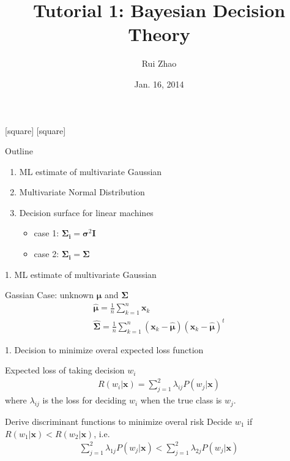 \documentclass[compress,blue]{beamer}
\title[ENGG 5202 Pattern Recogntion Tutorial 1]{Tutorial 1: Bayesian Decision Theory}
\author{Rui Zhao}
\institute{rzhao@ee.cuhk.edu.hk}
\date{Jan. 16, 2014}
\newcommand{\bx}{\mathbf{x}}
\newcommand{\bmu}{\mathbf{\mu}}
\newcommand{\bSig}{\mathbf{\Sigma}}
\begin{document}
\begin{frame}
\titlepage
\end{frame}

[square]
[square]

\begin{frame}{Outline}
	\begin{enumerate}
		\item<1-> ML estimate of multivariate Gaussian 
		\vspace{0.1in}
		\item<2-> Multivariate Normal Distribution
		\vspace{0.1in}
		\item<3-> Decision surface for linear machines
		\begin{itemize}
			\item case 1: $\mathbf{\Sigma_i} = \mathbf{\sigma}^2\mathbf{I}$
			\item case 2: $\mathbf{\Sigma_i} = \mathbf{\Sigma}$
		\end{itemize}
	\end{enumerate}
\end{frame}

\begin{frame}{1. ML estimate of multivariate Gaussian}
	\begin{block}{Gassian Case: unknown $\bmu$ and $\bSig$}
		\begin{align}
			\hat{\bmu} = \frac{1}{n}\sum_{k=1}^n\bx_k\\
			\hat{\bSig} = \frac{1}{n}\sum_{k=1}^n(\bx_k - \hat{\bmu})(\bx_k - \hat{\bmu})^t
		\end{align}
	\end{block}
\end{frame}

\begin{frame}{1. Decision to minimize overal expected loss function}
	\begin{block}{Expected loss of taking decision $w_i$}
		\vspace{-0.15in}
		\begin{align}
			R(w_i|\mathbf{x}) = \sum_{j=1}^2 \lambda_{ij} P(w_j | \mathbf{x})
		\end{align}
		where $\lambda_{ij}$ is the loss for deciding $w_i$ when the true class is $w_j$.
	\end{block}
	\pause
	\begin{block}{Derive discriminant functions to minimize overal risk}
		Decide $w_1$ if $R(w_1 | \mathbf{x}) < R(w_2 | \mathbf{x})$, i.e.
		\begin{align}
			\sum_{j=1}^2 \lambda_{1j} P(w_j | \mathbf{x}) < \sum_{j=1}^2 \lambda_{2j} P(w_j | \mathbf{x})
		\end{align}
	\end{block}
\end{frame}
\end{document}
